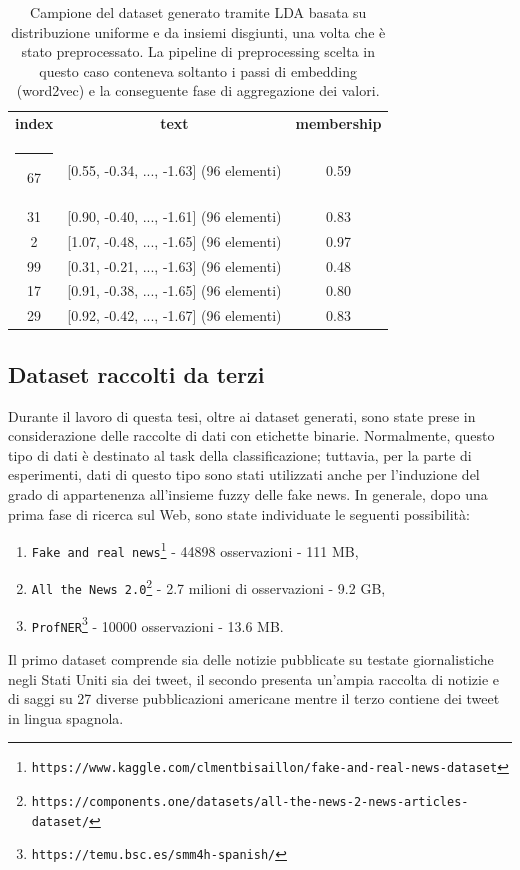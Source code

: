 \documentclass[12pt]{report}
\makeatletter
\theoremstyle{definition}
\newcommand{\thickhline}{%
    \noalign {\ifnum 0=`}\fi \hrule height 1pt
    \futurelet \reserved@a \@xhline
}
\makeatother
\begin{document}
\begin{table}
\centering
 \begin{tabular}{|c|c|c|} 
 \hline 
 \textbf{index} & \textbf{text} & \textbf{membership}
\\ [0.5ex] 
 \thickhline
67 & [0.55, -0.34, ..., -1.63] (96 elementi) & 0.59 \\
31 & [0.90, -0.40, ..., -1.61] (96 elementi) & 0.83\\ 
2 & [1.07, -0.48, ..., -1.65] (96 elementi) & 0.97\\
99 & [0.31, -0.21, ..., -1.63] (96 elementi) & 0.48\\
17 & [0.91, -0.38, ..., -1.65] (96 elementi) & 0.80\\
29 & [0.92, -0.42, ..., -1.67] (96 elementi) & 0.83\\
 \hline
\end{tabular}
\caption{Campione del dataset generato tramite LDA basata su distribuzione uniforme e da insiemi disgiunti, una volta che è stato preprocessato. La pipeline di preprocessing scelta in questo caso conteneva soltanto i passi di embedding (word2vec) e la conseguente fase di aggregazione dei valori.}
\label{uniformlda}
\end{table}

\subsection{Dataset raccolti da terzi}
Durante il lavoro di questa tesi, oltre ai dataset generati, sono state prese in considerazione delle raccolte di dati con etichette binarie. Normalmente, questo tipo di dati è destinato al task della classificazione; tuttavia, per la parte di esperimenti, dati di questo tipo sono stati utilizzati anche per l'induzione del grado di appartenenza all'insieme fuzzy delle fake news. In generale, dopo una prima fase di ricerca sul Web, sono state individuate le seguenti possibilità:
\begin{enumerate}
    \item \texttt{Fake and real news\footnote{https://www.kaggle.com/clmentbisaillon/fake-and-real-news-dataset}} - 44898 osservazioni - 111 MB,
    \item \texttt{All the News 2.0\footnote{https://components.one/datasets/all-the-news-2-news-articles-dataset/}} - 2.7 milioni di osservazioni - 9.2 GB,
    \item \texttt{ProfNER\footnote{https://temu.bsc.es/smm4h-spanish/}} - 10000 osservazioni - 13.6 MB.


\end{enumerate}
Il primo dataset comprende sia delle notizie pubblicate su testate giornalistiche negli Stati Uniti sia dei tweet, il secondo presenta un'ampia raccolta di notizie e di saggi su 27 diverse pubblicazioni americane mentre il terzo contiene dei tweet in lingua spagnola.
\end{document}
